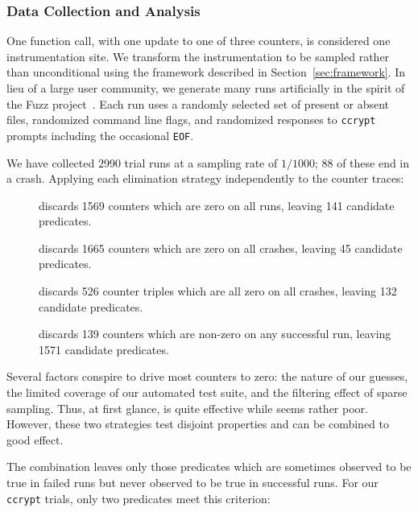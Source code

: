 \subsubsection{Data Collection and Analysis}

One function call, with one update to one of three counters, is considered one
instrumentation site.  We transform the instrumentation to be sampled
rather than unconditional using the framework described in
Section~\ref{sec:framework}.  In lieu of a large user community, we
generate many runs artificially in the spirit of the Fuzz
project~\cite{MKLMMNS95}.  Each run uses a randomly selected set of
present or absent files, randomized command line flags, and randomized
responses to \texttt{ccrypt} prompts including the occasional
\texttt{EOF}.

We have collected 2990 trial runs at a sampling rate of $1/1000$; 88
of these end in a crash.  Applying each elimination strategy
independently to the counter traces:

\begin{description}
\item[] discards 1569 counters which are
  zero on all runs, leaving 141 candidate predicates.

\item[] discards 1665 counters which are
  zero on all crashes, leaving 45 candidate predicates.

\item[] discards 526 counter triples
  which are all zero on all crashes, leaving 132 candidate predicates.

\item[] discards 139 counters which
  are non-zero on any successful run, leaving 1571 candidate
  predicates.
\end{description}

Several factors conspire to drive most counters to zero: the \naive
nature of our guesses, the limited coverage of our automated test
suite, and the filtering effect of sparse sampling.  Thus, at first
glance,  is quite effective
while  seems rather
poor.  However, these two strategies test disjoint properties and can
be combined to good effect.

The combination leaves only those predicates which are sometimes
observed to be true in failed runs but never observed to be true in
successful runs.  For our \texttt{ccrypt} trials, only two
predicates meet this criterion:


